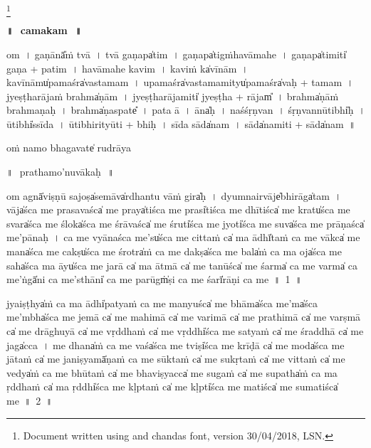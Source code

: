 \documentclass[parskip, DIV=14]{scrartcl}
\renewcommand{\thefootnote}{\fnsymbol{footnote}} %
\begin{document}
\LARGE\let\thefootnote\relax\footnote{\color{lightgray} Document written using \XeLaTeX{} and chandas font,  version 30/04/2018, LSN.}

\vspace{-1.5cm}

\begin{center}

\textbf{\Huge॥\,~camakam\,~॥}
\end{center}
\Large

{\centering	


\vspace{1cm}

om~। 
ga॒ṇānā̎ṁ tvā~।
tvā॒ ga॒ṇapa̍tim~।
ga॒ṇapa̍tigṁhavāmahe~।
ga॒ṇapa̍ti॒miti̍ ga॒ṇa + pa॒ti॒m~।
ha॒vā॒ma॒he॒ ka॒vim~।
ka॒viṁ ka̍vī॒nām~।
ka॒vī॒nāmu̍pa॒maśra̍vastamam~। 
u॒pa॒maśra̍vastama॒mityu̍pa॒maśra̍vaḥ + ta॒ma॒m~। 
jye॒ṣṭha॒rāja॒ṁ brahma̍ṇām~।
jye॒ṣṭha॒rāja॒miti̍ jyeṣṭha + rājam̎~।
brahma̍ṇāṁ brahmaṇaḥ~।
brahma̍ṇa॒spate̎~।
pa॒ta॒ ā~।
āna̍ḥ~।
na॒śśṛ॒ṇvan~।
śṛ॒ṇvannū॒tibhi̍ḥ~।
ū॒tibhi̍ssīda~।
ū॒tibhi॒rityū॒ti + bhi॒ḥ~। 
sī॒da॒ sāda̍nam~। 
sāda̍na॒miti॒ + sāda̍nam~॥ 

\vspace{5cm}

oṁ namo bhagavate̍ rudrā॒ya

\newpage
॥\,~prathamo'nuvākaḥ\,~॥\\

\vspace{1cm}

om agnā̍viṣṇū sa॒joṣa̍se॒māva̍rdhantu vā॒ṁ gira̍ḥ~। dyu॒mnairvāje̍bhi॒rāga̍tam~। vāja̍śca me prasa॒vaśca̍ me॒ praya̍tiśca me॒ prasi̍tiśca me dhī॒tiśca̍ me॒ kratu̍śca me॒ svara̍śca me॒ śloka̍śca me śrā॒vaśca̍ me॒ śruti̍śca me॒ jyoti̍śca me॒ suva̍śca me prā॒ṇaśca̍ me’pā॒naḥ~। ca॒ me vyā॒naśca॒ me’su̍śca me ci॒ttaṁ ca̍ ma॒ ādhī̍taṁ ca me॒ vākca̍ me॒ mana̍śca me॒ cakṣu̍śca me॒ śrotra̍ṁ ca me॒ dakṣa̍śca me॒ bala̍ṁ ca ma॒ oja̍śca me॒ saha̍śca ma॒ āyu̍śca me ja॒rā ca̍ ma ā॒tmā ca̍ me ta॒nūśca̍ me॒ śarma̍ ca me॒ varma̍ ca॒ me’ṅgā̍ni ca me॒’sthāni̍ ca me॒ parūgṁ̍ṣi ca me॒ śarī̍rāṇi ca me~॥~1~॥

jyaiṣṭhya̍ṁ ca ma॒ ādhi̍patyaṁ ca me ma॒nyuśca̍ me॒ bhāma̍śca॒ me’ma̍śca॒ me’mbha̍śca me je॒mā ca̍ me mahi॒mā ca̍ me vari॒mā ca̍ me prathi॒mā ca̍ me va॒rṣmā ca̍ me drāghu॒yā ca̍ me vṛ॒ddhaṁ ca̍ me॒ vṛddhi̍śca me sa॒tyaṁ ca̍ me śra॒ddhā ca̍ me॒ jaga̍cca~। me॒ dhana̍ṁ ca me॒ vaśa̍śca me॒ tviṣi̍śca me krī॒ḍā ca̍ me॒ moda̍śca me jā॒taṁ ca̍ me jani॒ṣyamā̍ṇaṁ ca me sū॒॒ktaṁ ca̍ me sukṛ॒taṁ ca̍ me vi॒ttaṁ ca̍ me॒ vedya̍ṁ ca me bhū॒॒taṁ ca̍ me bhavi॒ṣyacca̍ me su॒gaṁ ca̍ me su॒patha̍ṁ ca ma ṛ॒ddhaṁ ca̍ ma॒ ṛddhi̍śca me kḷ॒ptaṁ ca̍ me॒ kḷpti̍śca me ma॒tiśca̍ me suma॒tiśca̍ me~॥~2~॥

}
\end{document}
